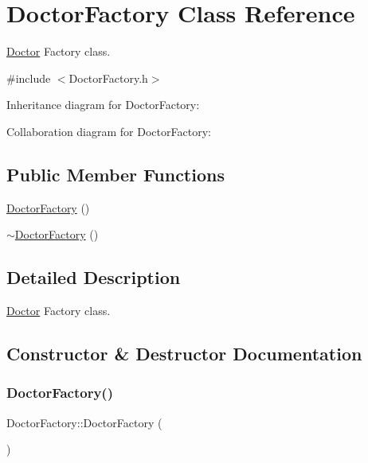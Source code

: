 \hypertarget{classDoctorFactory}{}\section{Doctor\+Factory Class Reference}
\label{classDoctorFactory}


\hyperlink{classDoctor}{Doctor} Factory class.  




{\ttfamily \#include $<$Doctor\+Factory.\+h$>$}



Inheritance diagram for Doctor\+Factory\+:


Collaboration diagram for Doctor\+Factory\+:
\subsection*{Public Member Functions}
\begin{DoxyCompactItemize}
\item 
\hyperlink{classDoctorFactory_aadc371102a234a3a86f46e029f6cf6fe}{Doctor\+Factory} ()
\item 
\hyperlink{classDoctorFactory_a3f2ed2a1a4378d3490c0412645f70767}{$\sim$\+Doctor\+Factory} ()
\end{DoxyCompactItemize}


\subsection{Detailed Description}
\hyperlink{classDoctor}{Doctor} Factory class. 

\subsection{Constructor \& Destructor Documentation}
\mbox{\label{classDoctorFactory_aadc371102a234a3a86f46e029f6cf6fe}} 
\subsubsection{\texorpdfstring{Doctor\+Factory()}{DoctorFactory()}}
{\footnotesize\ttfamily Doctor\+Factory\+::\+Doctor\+Factory (\begin{DoxyParamCaption}{ }\end{DoxyParamCaption})}

